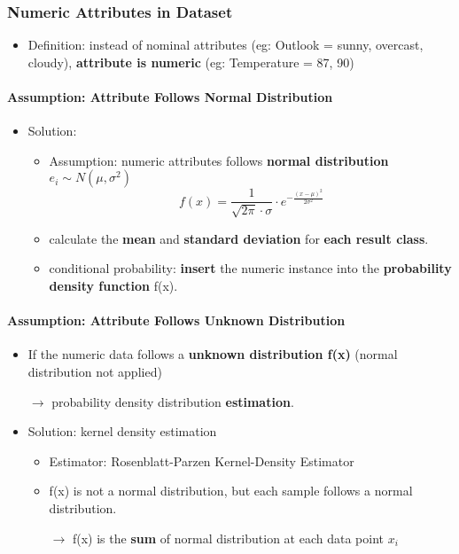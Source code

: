 \subsubsection{Numeric Attributes in Dataset}
\begin{itemize}
	\item Definition: instead of nominal attributes (eg: Outlook = sunny, overcast, cloudy), \textbf{attribute is numeric} (eg: Temperature = 87, 90)
\end{itemize}

\paragraph{Assumption: Attribute Follows Normal Distribution}
\begin{itemize}
	\item Solution:
	\begin{itemize}
		\item Assumption: numeric attributes follows \textbf{normal distribution} $e_i \sim N(\mu,\sigma^2)$
		$$f(x) = \frac{1}{\sqrt{2\pi}\cdot \sigma}\cdot e^{-\frac{(x-\mu)^2}{2 \sigma^2}}$$
		\item calculate the \textbf{mean} and \textbf{standard deviation} for \textbf{each result class}.
		\item conditional probability: \textbf{insert} the numeric instance into the \textbf{probability density function} f(x).
	\end{itemize}
	
	
\end{itemize}

\paragraph{Assumption: Attribute Follows Unknown Distribution}
\begin{itemize}
	\item If the numeric data follows a \textbf{unknown distribution f(x)} (normal distribution not applied) 
	
	$\rightarrow$ probability density distribution \textbf{estimation}.
	\item Solution: kernel density estimation 
	\begin{itemize}
		\item Estimator: Rosenblatt-Parzen Kernel-Density Estimator 
		\item f(x) is not a normal distribution, but each sample follows a normal distribution.
		
		$\rightarrow$ f(x) is the \textbf{sum} of normal distribution at each data point $x_i$
	\end{itemize}
\end{itemize}

